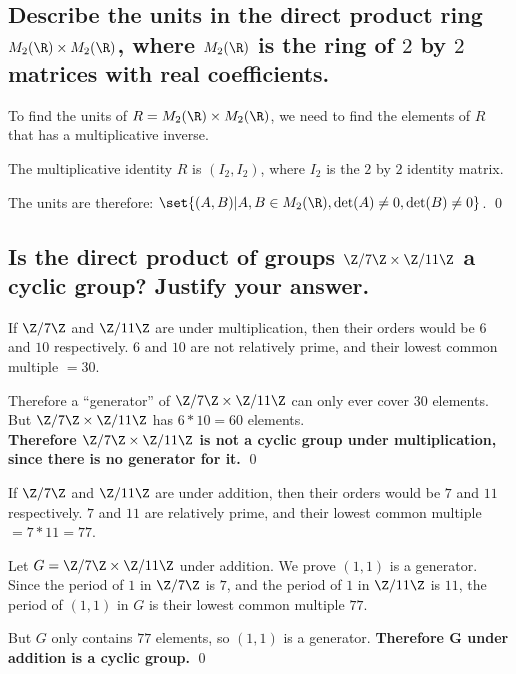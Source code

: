 \section[Problem 4]{
}  
    \subsection[(i)]{
        Describe the units in the direct product ring $M_2(\R) \times M_2(\R)$,
        where $M_2(\R)$ is the ring of $2$ by $2$ matrices with real coefficients.
    }
        To find the units of $R = M_2(\R) \times M_2(\R)$,
        we need to find the elements of $R$ that has a multiplicative inverse.

        The multiplicative identity $R$ is \(
            (I_2, I_2)
        \), where $I_2$ is the $2$ by $2$ identity matrix.

        The units are therefore: $\set{(A,B) | A, B \in M_2(\R), \det(A) \neq 0, \det(B) \neq 0}$.
        \qed

    \subsection[(ii)]{
        Is the direct product of groups $\Z/7\Z \times \Z/11\Z$ a cyclic group?
        Justify your answer.
    }
        If $\Z/7\Z$ and $\Z/11\Z$ are under multiplication,
        then their orders would be $6$ and $10$ respectively.
        $6$ and $10$ are not relatively prime, and their lowest common multiple $= 30$.

        Therefore a ``generator'' of $\Z/7\Z \times \Z/11\Z$ can only ever cover $30$ elements.
        But $\Z/7\Z \times \Z/11\Z$ has $6 * 10 = 60$ elements. \\
        \textbf{Therefore $\Z/7\Z \times \Z/11\Z$ is not a cyclic group under multiplication,
        since there is no generator for it.}
        \qed

        If $\Z/7\Z$ and $\Z/11\Z$ are under addition,
        then their orders would be $7$ and $11$ respectively.
        $7$ and $11$ are relatively prime, and their lowest common multiple $= 7*11 = 77$.

        Let $G = \Z/7\Z \times \Z/11\Z$ under addition.
        We prove $(1,1)$ is a generator.
        Since the period of $1$ in $\Z/7\Z$ is $7$,
        and the period of $1$ in $\Z/11\Z$ is $11$,
        the period of $(1,1)$ in $G$ is their lowest common multiple $77$.

        But $G$ only contains $77$ elements, so $(1,1)$ is a generator.
        \textbf{Therefore $\bm{G}$ under addition is a cyclic group.}
        \qed